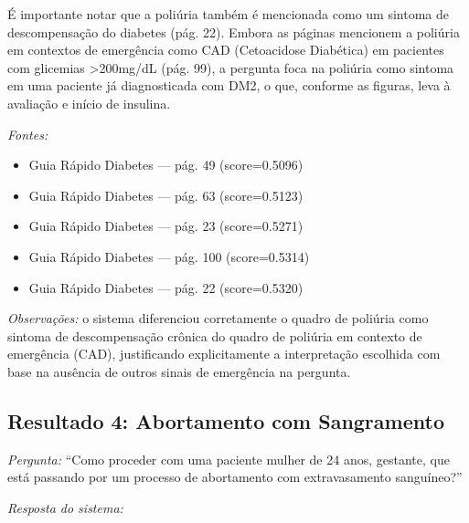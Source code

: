 \documentclass[conference,a4paper]{IEEEtran}
\begin{document}
É importante notar que a poliúria também é mencionada como um
sintoma de descompensação do diabetes (pág. 22). Embora as
páginas mencionem a poliúria em contextos de emergência como CAD
(Cetoacidose Diabética) em pacientes com glicemias >200mg/dL
(pág. 99), a pergunta foca na poliúria como sintoma em uma
paciente já diagnosticada com DM2, o que, conforme as figuras,
leva à avaliação e início de insulina.

\textit{Fontes:}
\begin{itemize}
  \item {Guia Rápido Diabetes} --- pág. 49 (score=0.5096)
  \item {Guia Rápido Diabetes} --- pág. 63 (score=0.5123)
  \item {Guia Rápido Diabetes} --- pág. 23 (score=0.5271)
  \item {Guia Rápido Diabetes} --- pág. 100 (score=0.5314)
  \item {Guia Rápido Diabetes} --- pág. 22 (score=0.5320)
\end{itemize}

\medskip
\noindent\textit{Observações:} o sistema diferenciou
corretamente o quadro de poliúria como sintoma de descompensação
crônica do quadro de poliúria em contexto de emergência (CAD),
justificando explicitamente a interpretação escolhida com base na
ausência de outros sinais de emergência na pergunta.

\subsection{Resultado 4: Abortamento com Sangramento}

\noindent\textit{Pergunta:} ``Como proceder com uma paciente
mulher de 24 anos, gestante, que está passando por um processo de
abortamento com extravasamento sanguíneo?''

\medskip
\noindent\textit{Resposta do sistema:}
\end{document}
